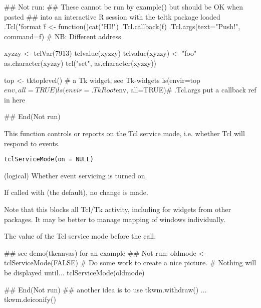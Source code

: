 \begin{Examples}
\begin{ExampleCode}
## Not run: 
## These cannot be run by example() but should be OK when pasted
## into an interactive R session with the tcltk package loaded
.Tcl("format \"%
f <- function()cat("HI!\n")
.Tcl.callback(f)
.Tcl.args(text="Push!", command=f) # NB: Different address

xyzzy <- tclVar(7913)
tclvalue(xyzzy)
tclvalue(xyzzy) <- "foo"
as.character(xyzzy)
tcl("set", as.character(xyzzy))

top <- tktoplevel() # a Tk widget, see Tk-widgets
ls(envir=top$env, all=TRUE)
ls(envir=.TkRoot$env, all=TRUE)# .Tcl.args put a callback ref in here

## End(Not run)
\end{ExampleCode}
\end{Examples}
%
\begin{Description}\relax
This function controls or reports on the Tcl service mode,
i.e. whether Tcl will respond to events.
\end{Description}
%
\begin{Usage}
\begin{verbatim}
tclServiceMode(on = NULL)
\end{verbatim}
\end{Usage}
%
\begin{Arguments}
\begin{ldescription}
\item[\code{on}] (logical) Whether event servicing is turned on. 
\end{ldescription}
\end{Arguments}
%
\begin{Details}\relax
If called with  (the default), no change is made.

Note that this blocks all Tcl/Tk activity, including for widgets from
other packages.  It may be better to manage mapping of windows individually.
\end{Details}
%
\begin{Value}
The value of the Tcl service mode before the call.
\end{Value}
%
\begin{Examples}
\begin{ExampleCode}
## see demo(tkcanvas) for an example
## Not run:     
oldmode <- tclServiceMode(FALSE)
# Do some work to create a nice picture.
# Nothing will be displayed until...
tclServiceMode(oldmode)

## End(Not run)
## another idea is to use tkwm.withdraw() ... tkwm.deiconify()
\end{ExampleCode}
\end{Examples}

